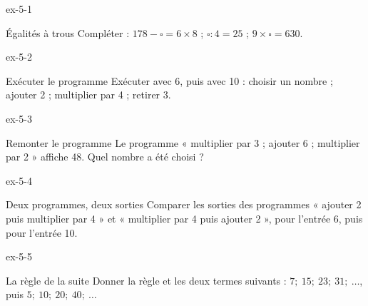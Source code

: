 \clearpage{}
\begin{blocLivre}{ex-5-1}\begin{exercice}[1]{Égalités à trous}
Compléter : $178-\square=6\times8$ ; $\square:4=25$ ; $9\times\square=630$.
\end{exercice}\end{blocLivre}
\begin{blocLivre}{ex-5-2}\begin{exercice}[1]{Exécuter le programme}
Exécuter avec 6, puis avec 10 : choisir un nombre ; ajouter 2 ; multiplier par 4 ; retirer 3.
\label{fig-ex-5-2}
\end{exercice}\end{blocLivre}
\begin{blocLivre}{ex-5-3}\begin{exercice}[1]{Remonter le programme}
Le programme « multiplier par 3 ; ajouter 6 ; multiplier par 2 » affiche 48. Quel nombre a été choisi ?
\end{exercice}\end{blocLivre}
\begin{blocLivre}{ex-5-4}\begin{exercice}[1]{Deux programmes, deux sorties}
Comparer les sorties des programmes « ajouter 2 puis multiplier par 4 » et « multiplier par 4 puis ajouter 2 », pour l’entrée 6, puis pour l’entrée 10.
\end{exercice}\end{blocLivre}
\begin{blocLivre}{ex-5-5}\begin{exercice}[1]{La règle de la suite}
Donner la règle et les deux termes suivants : $7 ;\ 15 ;\ 23 ;\ 31 ;\ \ldots$, puis $5 ;\ 10 ;\ 20 ;\ 40 ;\ \ldots$
\end{exercice}\end{blocLivre}

